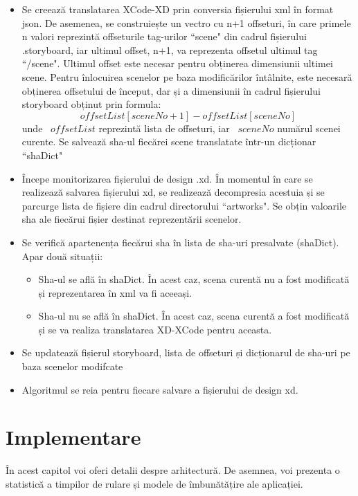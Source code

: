 \begin{itemize}  
\item Se creează translatarea XCode-XD prin conversia fișierului xml în format json. De asemenea, se construiește un vectro cu n+1 offseturi, în care primele n valori reprezintă offseturile tag-urilor ``scene" din cadrul fișierului .storyboard, iar ultimul offset, n+1, va reprezenta offsetul ultimul tag ``/scene". Ultimul offset este necesar pentru obținerea dimensiunii ultimei scene. Pentru înlocuirea scenelor pe baza modificărilor întâlnite, este necesară obținerea offsetului de început, dar și a dimensiunii în cadrul fișierului storyboard obținut prin formula: 
\[offsetList[sceneNo + 1] - offsetList[sceneNo]\]
unde ~$offsetList$ reprezintă lista de offseturi, iar ~$sceneNo$ numărul scenei curente. Se salvează sha-ul fiecărei scene translatate într-un dicționar ``shaDict"

\item Începe monitorizarea fișierului de design .xd. În momentul în care se realizează salvarea fișierului xd, se realizează decompresia acestuia și se parcurge lista de fișiere din cadrul directorului ``artworks". Se obțin valoarile sha ale fiecărui fișier destinat reprezentării scenelor. 
\item Se verifică apartenența fiecărui sha în lista de sha-uri presalvate (shaDict). Apar două situații:
    \begin{itemize}  
    \item Sha-ul se află în shaDict. În acest caz, scena curentă nu a fost modificată și reprezentarea în xml va fi aceeași.
    \item Sha-ul nu se află în shaDict. În acest caz, scena curentă a fost modificată și se va realiza translatarea XD-XCode pentru aceasta.
    \end{itemize}
\item Se updatează fișierul storyboard, lista de offseturi și dicționarul de sha-uri pe baza scenelor modifcate
\item Algoritmul se reia pentru fiecare salvare a fișierului de design xd.
\end{itemize}



\chapter{Implementare}

În acest capitol voi oferi detalii despre arhitectură. De asemnea, voi prezenta o statistică a timpilor de rulare și modele de îmbunătățire ale aplicației.

